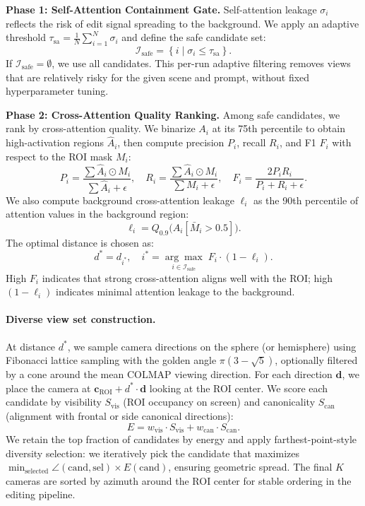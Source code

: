 \textbf{Phase 1: Self-Attention Containment Gate.}
Self-attention leakage $\sigma_i$ reflects the risk of edit signal spreading to the background.
We apply an adaptive threshold $\tau_{\text{sa}} = \frac{1}{N}\sum_{i=1}^{N} \sigma_i$ and define the safe candidate set:
\begin{equation}
\mathcal{I}_{\text{safe}} = \left\{ i \mid \sigma_i \leq \tau_{\text{sa}} \right\}.
\end{equation}
If $\mathcal{I}_{\text{safe}} = \emptyset$, we use all candidates.
This per-run adaptive filtering removes views that are relatively risky for the given scene and prompt, without fixed hyperparameter tuning.

\textbf{Phase 2: Cross-Attention Quality Ranking.}
Among safe candidates, we rank by cross-attention quality.
We binarize $A_i$ at its 75th percentile to obtain high-activation regions $\hat{A}_i$, then compute precision $P_i$, recall $R_i$, and F1 $F_i$ with respect to the ROI mask $M_i$:
\begin{equation}
P_i = \frac{\sum \hat{A}_i \odot M_i}{\sum \hat{A}_i + \epsilon}, \quad
R_i = \frac{\sum \hat{A}_i \odot M_i}{\sum M_i + \epsilon}, \quad
F_i = \frac{2 P_i R_i}{P_i + R_i + \epsilon}.
\end{equation}
We also compute background cross-attention leakage $\ell_i$ as the 90th percentile of attention values in the background region:
\begin{equation}
\ell_i = Q_{0.9}\bigl( A_i[\bar{M}_i > 0.5] \bigr).
\end{equation}
The optimal distance is chosen as:
\begin{equation}
d^* = d_{i^*}, \quad i^* = \underset{i \in \mathcal{I}_{\text{safe}}}{\arg\max}\; F_i \cdot (1 - \ell_i).
\end{equation}
High $F_i$ indicates that strong cross-attention aligns well with the ROI; high $(1-\ell_i)$ indicates minimal attention leakage to the background.

\paragraph{Diverse view set construction.}
At distance $d^*$, we sample camera directions on the sphere (or hemisphere) using Fibonacci lattice sampling with the golden angle $\pi(3-\sqrt{5})$, optionally filtered by a cone around the mean COLMAP viewing direction.
For each direction $\mathbf{d}$, we place the camera at $\mathbf{c}_{\text{ROI}} + d^* \cdot \mathbf{d}$ looking at the ROI center.
We score each candidate by visibility $S_{\text{vis}}$ (ROI occupancy on screen) and canonicality $S_{\text{can}}$ (alignment with frontal or side canonical directions):
\begin{equation}
E = w_{\text{vis}} \cdot S_{\text{vis}} + w_{\text{can}} \cdot S_{\text{can}}.
\end{equation}
We retain the top fraction of candidates by energy and apply farthest-point-style diversity selection: we iteratively pick the candidate that maximizes $\min_{\text{selected}} \angle(\text{cand}, \text{sel}) \times E(\text{cand})$, ensuring geometric spread.
The final $K$ cameras are sorted by azimuth around the ROI center for stable ordering in the editing pipeline.
